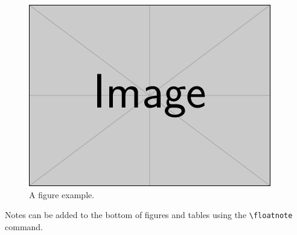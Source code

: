 \documentclass[bibtex,autowc]{apsr_submission}
\begin{document}
\begin{figure}[hbt!]
\includegraphics[width=\linewidth]{example-image}
\caption{A figure example.}
\label{fig:view}

\end{figure}


Notes can be added to the bottom of figures and tables using the \verb|\floatnote| command.
\end{document}
